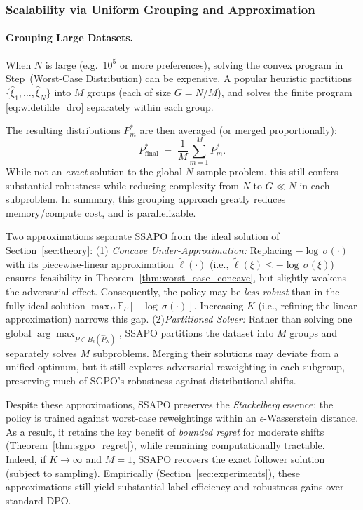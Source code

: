 \subsubsection{Scalability via Uniform Grouping and Approximation}
\label{subsec:discussion_approx}

\paragraph{Grouping Large Datasets.}
When $N$ is large (e.g.\ $\!10^5\!$ or more preferences), solving the convex program 
in Step~(Worst-Case Distribution) can be expensive.  A popular heuristic partitions 
$\{\hat{\xi}_1,\dots,\hat{\xi}_N\}$ into $M$ groups (each of size $G=N/M$), 
and solves the finite program \eqref{eq:widetilde_dro} separately within each group.  

The resulting distributions $P^*_m$ are then averaged (or merged proportionally):
\[
P_{\mathrm{final}}^*
\;=\;
\frac{1}{M}
\sum_{m=1}^M
P^*_m.
\]
While not an \emph{exact} solution to the global $N$-sample problem, 
this still confers substantial robustness while reducing complexity from 
$N$ to $G \ll N$ in each subproblem. In summary, this grouping approach greatly reduces memory/compute cost, and is parallelizable.

\begin{remark}
    Two approximations separate SSAPO from the ideal solution of 
Section~\ref{sec:theory}: (1) \emph{Concave Under-Approximation:}  
 Replacing $-\!\log\,\sigma(\cdot)$ with its piecewise-linear approximation $\widetilde{\ell}(\cdot)$ (i.e., $\widetilde{\ell}(\xi)\le -\!\log\,\sigma(\xi)$) ensures feasibility in Theorem~\ref{thm:worst_case_concave}, but slightly weakens the adversarial effect. Consequently, the policy may be \emph{less robust} than in the fully ideal solution $\max_{P}\!\mathbb{E}_P[-\!\log\,\sigma(\cdot)]$. Increasing $K$ (i.e., refining the linear approximation) narrows this gap. (2)\emph{Partitioned Solver:}   Rather than solving one global $\arg\max_{P \in B_\epsilon(\hat{P}_N)}$, SSAPO partitions the dataset into $M$ groups and separately solves $M$ subproblems. Merging their solutions may deviate from a unified optimum, but it still explores adversarial reweighting in each subgroup, preserving much of SGPO’s robustness against distributional shifts.
\end{remark}

\vspace{-0.1 in}
Despite these approximations, SSAPO preserves the \emph{Stackelberg} essence: the policy is trained against worst-case reweightings within an $\epsilon$-Wasserstein distance. As a result, it retains the key benefit of \emph{bounded regret} for moderate shifts (Theorem~\ref{thm:sgpo_regret}), while remaining computationally tractable. Indeed, if $K \!\to\! \infty$ and $M\!=\!1$, SSAPO recovers the exact follower solution (subject to sampling). Empirically (Section~\ref{sec:experiments}), these approximations still yield substantial label-efficiency and robustness gains over standard DPO.